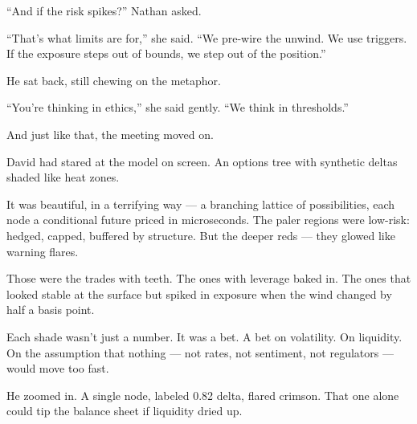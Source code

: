 “And if the risk spikes?” Nathan asked.

“That’s what limits are for,” she said. “We pre-wire the unwind. We use triggers. If the exposure 
steps out of bounds, we step out of the position.”

He sat back, still chewing on the metaphor.

“You’re thinking in ethics,” she said gently. “We think in thresholds.”

And just like that, the meeting moved on.

    

David had stared at the model on screen.
An options tree with synthetic deltas shaded like heat zones.

It was beautiful, in a terrifying way — a branching lattice of possibilities, each node a 
conditional future priced in microseconds.
The paler regions were low-risk: hedged, capped, buffered by structure.
But the deeper reds — they glowed like warning flares.

Those were the trades with teeth.
The ones with leverage baked in.
The ones that looked stable at the surface but spiked in exposure when the wind changed by 
half a basis point.

Each shade wasn’t just a number.
It was a bet.
A bet on volatility. On liquidity. On the assumption that nothing — not rates, not sentiment, 
not regulators — would move too fast.

He zoomed in. A single node, labeled 0.82 delta, flared crimson.
That one alone could tip the balance sheet if liquidity dried up.

